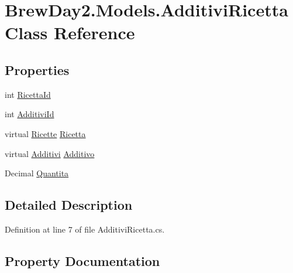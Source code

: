 \hypertarget{class_brew_day2_1_1_models_1_1_additivi_ricetta}{}\section{Brew\+Day2.\+Models.\+Additivi\+Ricetta Class Reference}
\label{class_brew_day2_1_1_models_1_1_additivi_ricetta}
\subsection*{Properties}
\begin{DoxyCompactItemize}
\item 
int \mbox{\hyperlink{class_brew_day2_1_1_models_1_1_additivi_ricetta_a083fb6283b67dc08f8e2806b6e9a2fa8}{Ricetta\+Id}}
\item 
int \mbox{\hyperlink{class_brew_day2_1_1_models_1_1_additivi_ricetta_aff59b0e18b213af4829319bb4a4d4b2e}{Additivi\+Id}}
\item 
virtual \mbox{\hyperlink{class_brew_day2_1_1_models_1_1_ricette}{Ricette}} \mbox{\hyperlink{class_brew_day2_1_1_models_1_1_additivi_ricetta_adaebdcec4e6afff9d235dd15806df3a7}{Ricetta}}
\item 
virtual \mbox{\hyperlink{class_brew_day2_1_1_models_1_1_additivi}{Additivi}} \mbox{\hyperlink{class_brew_day2_1_1_models_1_1_additivi_ricetta_a9f0027a39bab470e9f7ba94ce41970c3}{Additivo}}
\item 
Decimal \mbox{\hyperlink{class_brew_day2_1_1_models_1_1_additivi_ricetta_ad830e1e3d442b60e54a70e520de13e38}{Quantita}}
\end{DoxyCompactItemize}


\subsection{Detailed Description}


Definition at line 7 of file Additivi\+Ricetta.\+cs.



\subsection{Property Documentation}
\mbox{\label{class_brew_day2_1_1_models_1_1_additivi_ricetta_aff59b0e18b213af4829319bb4a4d4b2e}} 
